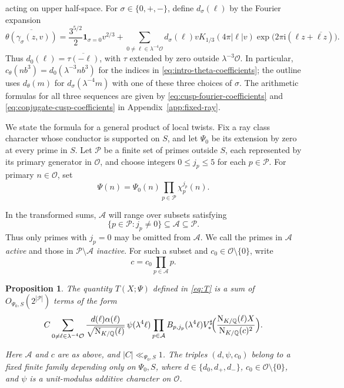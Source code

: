 \documentclass[11pt,a4paper]{article}
\numberwithin{equation}{section}
\numberwithin{figure}{section}
\newtheorem{proposition}[theorem]{Proposition}
\theoremstyle{definition}
\theoremstyle{remark}
\newcommand{\Q}{\mathbb Q}
\newcommand{\NK}{\mathrm N_{K/\Q}}
\newcommand{\OO}{\mathcal O}
\newcommand{\ind}{\mathbf1}
\begin{document}
acting on upper half-space. For $\sigma\in\{0,+,-\}$, define
$d_\sigma(\ell)$ by the Fourier expansion \cite[(5.9), (5.15)]{DR}
\begin{equation}\label{eq:cusp-coefficient-definition}
 \overline{\theta(\gamma_\sigma(z,v))}
 =\frac{3^{5/2}}2\ind_{\sigma=0}v^{2/3} +\sum_{0\ne\ell\in\lambda^{-4}\OO}
 d_\sigma(\ell)vK_{1/3}(4\pi|\ell|v)
 \exp\!\bigl(2\pi\mathrm i(\ell z+\overline{\ell z})\bigr).
\end{equation}
Thus $d_0(\ell)=\overline{\tau(-\ell)}$, with $\tau$ extended by zero
outside $\lambda^{-3}\OO$.
In particular, $c_\theta(nb^3)=d_0(\lambda^{-3}nb^3)$ for the indices in \eqref{eq:intro-theta-coefficients}; the outline uses $d_\theta(m)$ for $d_\sigma(\lambda^{-4}m)$ with one of these three choices of $\sigma$. The arithmetic formulas for all three
sequences are given by \eqref{eq:cusp-fourier-coefficients} and
\eqref{eq:conjugate-cusp-coefficients} in Appendix~\ref{app:fixed-ray}.

We state the formula for a general product of local twists.
Fix a ray class character whose conductor is supported on $S$,
and let $\Psi_0$ be its extension by zero at every prime in $S$.
Let $\mathcal P$ be a finite set of primes outside $S$,
each represented by its primary generator in $\OO$,
and choose integers $0\le j_p\le5$ for each $p\in\mathcal P$.
For primary $n\in\OO$, set
\[
 \Psi(n)=\Psi_0(n)\prod_{p\in\mathcal P}\chi_p^{j_p}(n).
\]


In the transformed sums, $\mathcal A$ will range over subsets satisfying
\[
 \{p\in\mathcal P:j_p\ne0\}\subseteq\mathcal A\subseteq\mathcal P.
\]
Thus only primes with $j_p=0$ may be omitted from $\mathcal A$.
We call the primes in $\mathcal A$ \emph{active} and those in $\mathcal P\setminus\mathcal A$ \emph{inactive}.
For such a subset and $c_0\in\OO\setminus\{0\}$, write
\[
 c=c_0\prod_{p\in\mathcal A}p.
\]


\begin{proposition}\label{lem:reflection}
The quantity $T(X;\Psi)$ defined in \eqref{eq:T} is a sum of $O_{\Psi_0,S}(2^{|\mathcal P|})$ terms of the form
\begin{equation}\label{eq:reflection}
 C\sum_{0\ne\ell\in\lambda^{-4}\OO}
 \frac{d(\ell)\alpha(\ell)}{\sqrt{\NK(\ell)}}\,
 \psi(\lambda^4\ell)
 \prod_{p\in\mathcal A}B_{p,j_p}(\lambda^4\ell)
 V_*^\sharp\!\Bigl(\frac{\NK(\ell) X}{\NK(c)^2}\Bigr).
\end{equation}


Here $\mathcal A$ and $c$ are as above, and $|C|\ll_{\Psi_0,S}1$.
The triples $(d,\psi,c_0)$ belong to a fixed finite family depending
only on $\Psi_0,S$, where $d\in\{d_0,d_+,d_-\}$,
$c_0\in\OO\setminus\{0\}$, and $\psi$ is a unit-modulus additive
character on $\OO$.
\end{proposition}
\end{document}
